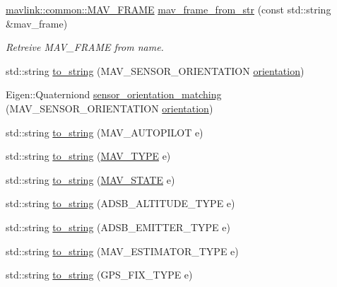 \begin{DoxyCompactItemize}
\mbox{\hyperlink{include__v0_89_2mavlink__types_8h_aae9266d97d838a375605b69000c60617}{mavlink\+::common\+::\+M\+A\+V\+\_\+\+F\+R\+A\+ME}} \mbox{\hyperlink{group__mavutils_gaeecc00ce9cf4ea787c7309235e35cf8d}{mav\+\_\+frame\+\_\+from\+\_\+str}} (const std\+::string \&mav\+\_\+frame)
\begin{DoxyCompactList}\small\item\em Retreive M\+A\+V\+\_\+\+F\+R\+A\+ME from name. \end{DoxyCompactList}\item 
std\+::string \mbox{\hyperlink{group__nodelib_ga9e44e56802676785fc349d1d5b808b4c}{to\+\_\+string}} (M\+A\+V\+\_\+\+S\+E\+N\+S\+O\+R\+\_\+\+O\+R\+I\+E\+N\+T\+A\+T\+I\+ON \mbox{\hyperlink{structorientation}{orientation}})
\item 
Eigen\+::\+Quaterniond \mbox{\hyperlink{group__nodelib_ga4a6acaf5ab9bea03955ceb53971e2aab}{sensor\+\_\+orientation\+\_\+matching}} (M\+A\+V\+\_\+\+S\+E\+N\+S\+O\+R\+\_\+\+O\+R\+I\+E\+N\+T\+A\+T\+I\+ON \mbox{\hyperlink{structorientation}{orientation}})
\item 
std\+::string \mbox{\hyperlink{group__nodelib_gae43f4bc89e45c8218d19cce11c2092bc}{to\+\_\+string}} (M\+A\+V\+\_\+\+A\+U\+T\+O\+P\+I\+L\+OT e)
\item 
std\+::string \mbox{\hyperlink{group__nodelib_ga7867559a9a91c6dbc4c7e32e6cc3e018}{to\+\_\+string}} (\mbox{\hyperlink{include__v0_89_2mavlink__types_8h_aaf404a9fdbd4c9a05d6cab18790dbb28}{M\+A\+V\+\_\+\+T\+Y\+PE}} e)
\item 
std\+::string \mbox{\hyperlink{group__nodelib_ga6c5689b022d0d0b05dfae454aa234013}{to\+\_\+string}} (\mbox{\hyperlink{include__v0_89_2mavlink__types_8h_a3ca5e79cdc1f95d953a6d1d7ab1e90bb}{M\+A\+V\+\_\+\+S\+T\+A\+TE}} e)
\item 
std\+::string \mbox{\hyperlink{group__nodelib_ga84bd1657cfa53e03354e352f2e90e993}{to\+\_\+string}} (A\+D\+S\+B\+\_\+\+A\+L\+T\+I\+T\+U\+D\+E\+\_\+\+T\+Y\+PE e)
\item 
std\+::string \mbox{\hyperlink{group__nodelib_gabc30a3ebb411640d92d95e1e2e50be24}{to\+\_\+string}} (A\+D\+S\+B\+\_\+\+E\+M\+I\+T\+T\+E\+R\+\_\+\+T\+Y\+PE e)
\item 
std\+::string \mbox{\hyperlink{group__nodelib_ga0e38ef0fd30a43511190d569fdca799a}{to\+\_\+string}} (M\+A\+V\+\_\+\+E\+S\+T\+I\+M\+A\+T\+O\+R\+\_\+\+T\+Y\+PE e)
\item 
std\+::string \mbox{\hyperlink{group__nodelib_gacb77da537287a4ebf732b8b04832466e}{to\+\_\+string}} (G\+P\+S\+\_\+\+F\+I\+X\+\_\+\+T\+Y\+PE e)
\item 

\end{DoxyCompactItemize}

